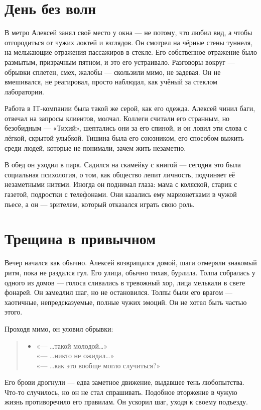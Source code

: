 \documentclass[12pt,a4paper]{book}
\newenvironment{dialogue}{\begin{quote}\itshape\begin{itemize}\item[]}{\end{itemize}\end{quote}}
\begin{document}
\section{День без волн}

В метро Алексей занял своё место у окна --- не потому, что любил вид, а чтобы отгородиться от чужих локтей и взглядов. Он смотрел на чёрные стены туннеля, на мелькающие отражения пассажиров в стекле. Его собственное отражение было размытым, призрачным пятном, и это его устраивало. Разговоры вокруг --- обрывки сплетен, смех, жалобы --- скользили мимо, не задевая. Он не вмешивался, не реагировал, просто наблюдал, как учёный за стеклом лаборатории.

Работа в IT-компании была такой же серой, как его одежда. Алексей чинил баги, отвечал на запросы клиентов, молчал. Коллеги считали его странным, но безобидным --- «Тихий», шептались они за его спиной, и он ловил эти слова с лёгкой, скрытой улыбкой. Тишина была его союзником, его способом выжить среди людей, которые не понимали, зачем жить незаметно.

В обед он уходил в парк. Садился на скамейку с книгой --- сегодня это была социальная психология, о том, как общество лепит личность, подчиняет её незаметными нитями. Иногда он поднимал глаза: мама с коляской, старик с газетой, подростки с телефонами. Они казались ему марионетками в чужой пьесе, а он --- зрителем, который отказался играть свою роль.

\section{Трещина в привычном}

Вечер начался как обычно. Алексей возвращался домой, шаги отмеряли знакомый ритм, пока не раздался гул. Его улица, обычно тихая, бурлила. Толпа собралась у одного из домов --- голоса сливались в тревожный хор, лица мелькали в свете фонарей. Он замедлил шаг, но не остановился. Толпы были его врагом --- хаотичные, непредсказуемые, полные чужих эмоций. Он не хотел быть частью этого.

Проходя мимо, он уловил обрывки:

\begin{dialogue}
«--- \ldots такой молодой\ldots»\\[0.5em]
«--- \ldots никто не ожидал\ldots»\\[0.5em]
«--- \ldots как это вообще могло случиться?»
\end{dialogue}

Его брови дрогнули --- едва заметное движение, выдавшее тень любопытства. Что-то случилось, но он не стал спрашивать. Подобное вторжение в чужую жизнь противоречило его правилам. Он ускорил шаг, уходя к своему подъезду.
\end{document}
